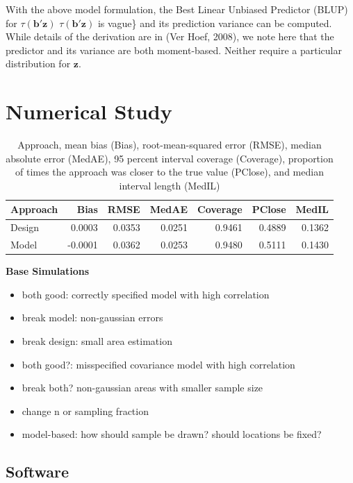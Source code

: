 \documentclass[]{elsarticle} %
\begin{document}
With the above model formulation, the Best Linear Unbiased Predictor
(BLUP) for \(\tau(\mathbf{b}'\mathbf{z})\)
\(\tau(\mathbf{b}'\mathbf{z})\) is vague\} and its prediction variance
can be computed. While details of the derivation are in (Ver Hoef,
2008), we note here that the predictor and its variance are both
moment-based. Neither require a particular distribution for
\(\mathbf{z}\).

\hypertarget{sec:numstudy}{%
\section{Numerical Study}\label{sec:numstudy}}

\begin{table}[ht]
\centering
\begin{tabular}{lrrrrrr}
  \hline
Approach & Bias & RMSE & MedAE & Coverage & PClose & MedIL \\ 
  \hline
Design & 0.0003 & 0.0353 & 0.0251 & 0.9461 & 0.4889 & 0.1362 \\ 
  Model & -0.0001 & 0.0362 & 0.0253 & 0.9480 & 0.5111 & 0.1430 \\ 
   \hline
\end{tabular}
\caption{Approach, mean bias (Bias), root-mean-squared error (RMSE), median absolute error (MedAE), 95 percent interval coverage (Coverage), proportion of times the approach was closer to the true value (PClose), and median interval length (MedIL)} 
\label{tab:sim_one}
\end{table}

\textbf{Base Simulations}

\begin{itemize}
\item
  both good: correctly specified model with high correlation
\item
  break model: non-gaussian errors
\item
  break design: small area estimation
\item
  both good?: misspecified covariance model with high correlation
\item
  break both? non-gaussian areas with smaller sample size
\item
  change n or sampling fraction
\item
  model-based: how should sample be drawn? should locations be fixed?
\end{itemize}

\hypertarget{software}{%
\subsection{Software}\label{software}}
\end{document}
